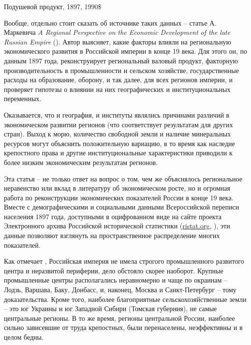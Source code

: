 \documentclass[a4paper,12pt]{article}
\begin{document}
\begin{table}[h]
	\caption{Подушевой продукт, 1897, 1990\$ \citep{markevich_regional_2019}}
	\newcommand{\tableecowidth}{0.5\textwidth}
	
\end{table}

Вообще, отдельно стоит сказать об источнике таких данных -- статье А. Маркевича \emph{A Regional Perspective on the Economic Development of the late Russian Empire} (\citeyear{markevich_regional_2019}).
Автор выясняет, какие факторы влияли на региональную экономического развития в Российской империи в конце 19 века. Для этого он, по данным 1897 года, реконструирует региональный валовый продукт, факторную производительность в промышленности и сельском хозяйстве, государственные расходы на образование, оборону, и так далее, для всех регионов империи, и проверяет гипотезы о влиянии на них географических и институциональных переменных.

Оказывается, что и география, и институты являлись причинами различий в экономическом развитии регионов (что соответствует результатам для других стран). Выход к морю, количество свободной земли и наличие минеральных ресурсов могут объяснить положительную вариацию, в то время как наследие крепостного права и другие институциональные характеристики приводили к более низким экономическим результатам регионов.

Эта статья -- не только ответ на вопрос о том, чем же объяснялось региональное неравенство или вклад в литературу об экономическом росте, но и огромная работа по реконструкции экономических показателей России в конце 19 века. 
Вместе с демографическими и социальными данными Всероссийской переписи населения 1897 года, доступными в оцифрованном виде на сайте проекта Электронного архива Российской исторической статистики (\href{http://ristat.org}{ristat.org}, \cite{ristat_2020}), эти данные позволяют взглянуть на пространственное распределение многих показателей.

Как отмечает \citeauthor{markevich_regional_2019}, Российская империя не имела строгого промышленного развитого центра и неразвитой периферии, дело обстояло скорее наоборот. Крупные промышленные центры располагались неравномерно и чаще по окраинам -- Лодзь, Варшава, Баку, Донбасс, и, наконец, Москва и Санкт-Петербург -- тому доказательства. Кроме того, наиболее благоприятные сельскохозяйственные земли -- это юг Украины и юг Западной Сибири (Томская губерния), не самые центральные регионы. В то же время, регионы центральной России, наиболее сильно зависевшие от труда крепостных, были перенаселены, неэффективны и в целом бедны.
\end{document}
